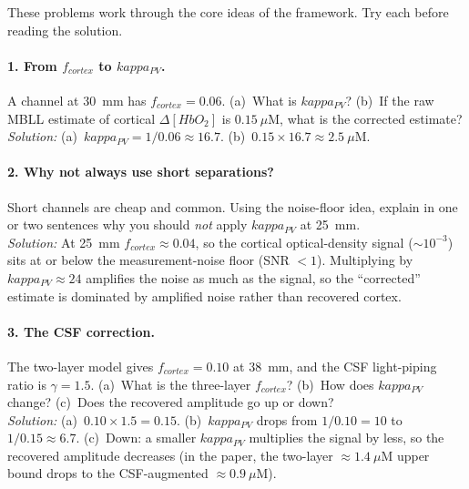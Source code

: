 \documentclass[12pt]{article}
\def\kappa{kappa}%
\def\text#1{#1}%
\begin{document}
These problems work through the core ideas of the framework. Try each before reading the solution.

\paragraph{1. From $f_{\text{cortex}}$ to $\kappa_{\text{PV}}$.} A channel at 30~mm has $f_{\text{cortex}}=0.06$. (a)~What is $\kappa_{\text{PV}}$? (b)~If the raw MBLL estimate of cortical $\Delta[\text{HbO}_2]$ is $0.15~\mu$M, what is the corrected estimate?\\
\textit{Solution:} (a)~$\kappa_{\text{PV}}=1/0.06\approx16.7$. (b)~$0.15\times16.7\approx2.5~\mu$M.

\paragraph{2. Why not always use short separations?} Short channels are cheap and common. Using the noise-floor idea, explain in one or two sentences why you should \emph{not} apply $\kappa_{\text{PV}}$ at 25~mm.\\
\textit{Solution:} At 25~mm $f_{\text{cortex}}\approx0.04$, so the cortical optical-density signal ($\sim10^{-3}$) sits at or below the measurement-noise floor (SNR $<1$). Multiplying by $\kappa_{\text{PV}}\approx24$ amplifies the noise as much as the signal, so the ``corrected'' estimate is dominated by amplified noise rather than recovered cortex.

\paragraph{3. The CSF correction.} The two-layer model gives $f_{\text{cortex}}=0.10$ at 38~mm, and the CSF light-piping ratio is $\gamma=1.5$. (a)~What is the three-layer $f_{\text{cortex}}$? (b)~How does $\kappa_{\text{PV}}$ change? (c)~Does the recovered amplitude go up or down?\\
\textit{Solution:} (a)~$0.10\times1.5=0.15$. (b)~$\kappa_{\text{PV}}$ drops from $1/0.10=10$ to $1/0.15\approx6.7$. (c)~Down: a smaller $\kappa_{\text{PV}}$ multiplies the signal by less, so the recovered amplitude decreases (in the paper, the two-layer $\approx1.4~\mu$M upper bound drops to the CSF-augmented $\approx0.9~\mu$M).
\end{document}
